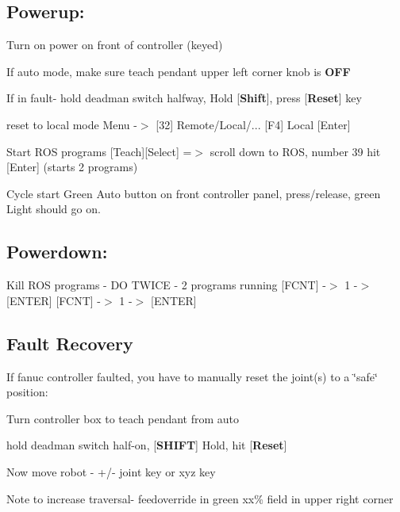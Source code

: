 \subsection*{Powerup\-: }


\begin{DoxyEnumerate}
\item Turn on power on front of controller (keyed)
\item If auto mode, make sure teach pendant upper left corner knob is {\bfseries O\-F\-F}
\item If in fault-\/ hold deadman switch halfway, Hold \mbox{[}{\bfseries Shift}\mbox{]}, press \mbox{[}{\bfseries Reset}\mbox{]} key
\item reset to local mode {\ttfamily Menu -\/$>$ \mbox{[}32\mbox{]} Remote/\-Local/... \mbox{[}F4\mbox{]} Local \mbox{[}Enter\mbox{]}}
\item Start R\-O\-S programs {\ttfamily \mbox{[}Teach\mbox{]}\mbox{[}Select\mbox{]} =$>$ scroll down to R\-O\-S, number 39 hit \mbox{[}Enter\mbox{]}} (starts 2 programs)
\item Cycle start {\ttfamily Green Auto button on front controller panel, press/release, green Light should go on}.
\end{DoxyEnumerate}

\subsection*{Powerdown\-: }


\begin{DoxyEnumerate}
\item Kill R\-O\-S programs -\/ D\-O T\-W\-I\-C\-E -\/ 2 programs running {\ttfamily \mbox{[}F\-C\-N\-T\mbox{]} -\/$>$ 1 -\/$>$ \mbox{[}E\-N\-T\-E\-R\mbox{]}} {\ttfamily \mbox{[}F\-C\-N\-T\mbox{]} -\/$>$ 1 -\/$>$ \mbox{[}E\-N\-T\-E\-R\mbox{]}}
\end{DoxyEnumerate}

\subsection*{Fault Recovery }

If fanuc controller faulted, you have to manually reset the joint(s) to a \char`\"{}safe\char`\"{} position\-:


\begin{DoxyEnumerate}
\item Turn controller box to teach pendant from auto
\item hold deadman switch half-\/on, \mbox{[}{\bfseries S\-H\-I\-F\-T}\mbox{]} Hold, hit \mbox{[}{\bfseries Reset}\mbox{]}
\item Now move robot -\/ +/-\/ joint key or xyz key
\item Note to increase traversal-\/ feedoverride in green xx\% field in upper right corner
\end{DoxyEnumerate}

